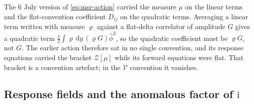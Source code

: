 \documentclass[a4paper,11pt]{article}
\newcommand{\semibold}[1]{{\fontseries{b}\selectfont{#1}}}
\renewcommand{\d}{\mathrm{d}}
\newcommand{\im}{\mathrm{i}}
\newenvironment{panel}{\begin{tcolorbox}[enhanced,breakable,colback=gray!10,colframe=gray!30]\small}{\end{tcolorbox}}
\newcommand{\field}{\phi}                    %
\newcommand{\yco}{y}                         %
\newcommand{\measure}{\mu}                   %
\newcommand{\Dnoise}[1]{D_{#1}}              %
\newcommand{\volel}{\mathcal{V}}             %
\begin{document}
\begin{panel}
\semibold{The earlier action was a splice.} The 6 July version of
\eqref{eq:msr-action} carried the measure $\measure$ on the linear terms
and the flat-convention coefficient $\Dnoise{ij}$ on the quadratic terms.
Averaging a linear term written with measure $\varrho$ against a
flat-delta correlator of amplitude $G$ gives a quadratic term
$\tfrac12\int\varrho\,\d\yco\,(\varrho G)\hat\field^2$, so the quadratic
coefficient must be $\varrho G$, not $G$. The earlier action therefore sat
in no single convention, and its response equations carried the bracket
$\mathcal{Z}[\measure]$ while its forward equations were flat. That bracket
is a convention artefact; in the $\volel$ convention it vanishes.
\end{panel}

\subsection{Response fields and the anomalous factor of $\im$}
\label{sec:response-rotation}
\end{document}
